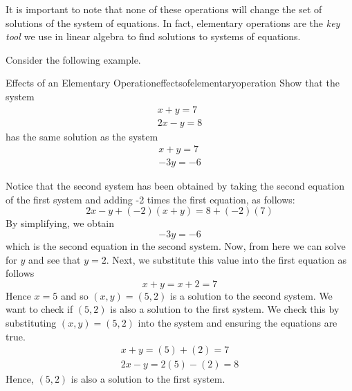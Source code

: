 It is important to note that none of these operations will 
change the set of solutions of the system of equations. In fact, elementary operations are the {\em key tool \em}we use in linear algebra to find solutions to systems of equations. 

Consider the following example.  

\begin{example}{Effects of an Elementary Operation}{effectsofelementaryoperation}
Show that the system 
\begin{equation*}
\begin{array}{c}
x+y=7 \\
2x-y=8
\end{array}
\end{equation*}
has the same solution as the system 
\begin{equation*}
\begin{array}{c}
x+y=7 \\
-3y=-6
\end{array}
\end{equation*}
\end{example}

\begin{solution}
Notice that the second system has been obtained by taking the second equation of the first system
and adding -2 times the first equation, as follows:
\begin{equation*}
2x-y + (-2)(x+y) = 8 + (-2)(7)
\end{equation*}
By simplifying, we obtain
\begin{equation*}
-3y=-6
\end{equation*}
which is the second equation in the second system.
Now, from here we can solve for $y$ and see that $y=2$. Next, we substitute this value into the first equation as follows \:
\begin{equation*}
x+y=x+2=7
\end{equation*}
Hence $x=5$ and so $\left( x,y\right) = \left(5,2 \right)$ is a solution to the second system.  
We want to check if $\left(5,2 \right)$ is also a solution to the first system. We check this by substituting $\left(x, y \right) = \left(5,2 \right)$
into the system and ensuring the equations are true.
\begin{equation*}
\begin{array}{c}
x+y = \left(5 \right)+ \left( 2 \right) = 7 \\
2x-y= 2 \left(5 \right) - \left( 2 \right) = 8
\end{array}
\end{equation*}
Hence, $\left(5,2 \right)$ is also a solution to the first system. 
\end{solution}

